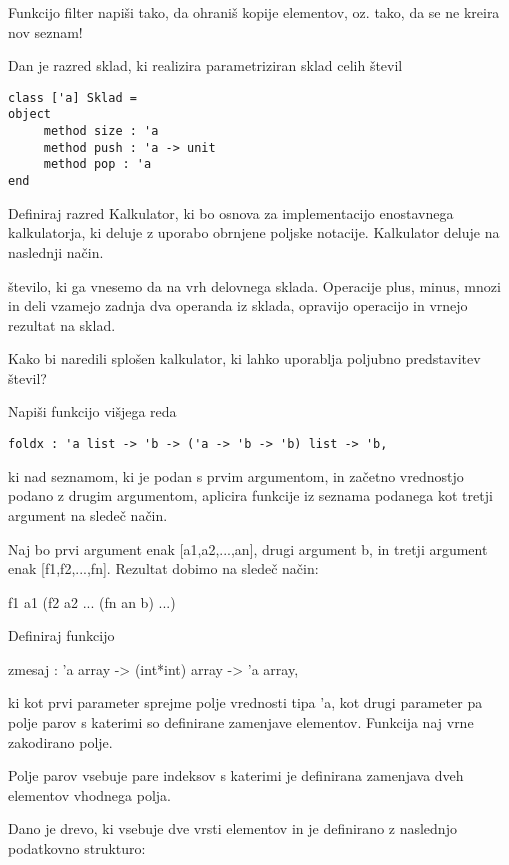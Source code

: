 \begin{ex}
Funkcijo filter napi\v si tako, da ohrani\v s kopije elementov, oz. tako, da se ne kreira nov seznam!


\end{ex} \begin{ex}
Dan je razred sklad, ki realizira parametriziran sklad celih \v stevil
\begin{verbatim}
class ['a] Sklad =
object 
     method size : 'a
     method push : 'a -> unit
     method pop : 'a
end
\end{verbatim}
Definiraj razred Kalkulator, ki bo osnova za implementacijo enostavnega kalkulatorja, ki deluje z uporabo obrnjene poljske notacije. Kalkulator deluje na naslednji na\v cin.  

\v stevilo, ki ga vnesemo da na vrh delovnega sklada. Operacije plus, minus, mnozi in deli vzamejo zadnja dva operanda iz sklada, opravijo operacijo in vrnejo rezultat na sklad. 

Kako bi naredili splo\v sen kalkulator, ki lahko uporablja poljubno predstavitev \v stevil?


\end{ex} \begin{ex}
Napi\v si funkcijo vi\v sjega reda 

\begin{verbatim}
foldx : 'a list -> 'b -> ('a -> 'b -> 'b) list -> 'b,
\end{verbatim}

ki nad seznamom, ki je podan s prvim argumentom, in za\v cetno vrednostjo podano z drugim argumentom, aplicira funkcije iz seznama podanega kot tretji argument na slede\v c na\v cin. 

Naj bo prvi argument enak [a1,a2,...,an], drugi argument b, in tretji argument enak [f1,f2,...,fn]. Rezultat dobimo na slede\v c na\v cin: 

f1 a1  (f2 a2 ... (fn  an b) ...)


\end{ex} \begin{ex}
Definiraj funkcijo 

zmesaj : 'a array -> (int*int) array -> 'a array, 

ki kot prvi parameter sprejme polje vrednosti tipa 'a, kot drugi parameter pa polje parov s katerimi so definirane zamenjave elementov. Funkcija naj vrne zakodirano polje. 

Polje parov vsebuje pare indeksov s katerimi je definirana zamenjava dveh elementov vhodnega polja. 


\end{ex} \begin{ex}
Dano je drevo, ki vsebuje dve vrsti elementov in je definirano z naslednjo podatkovno strukturo: 


\end{ex}
